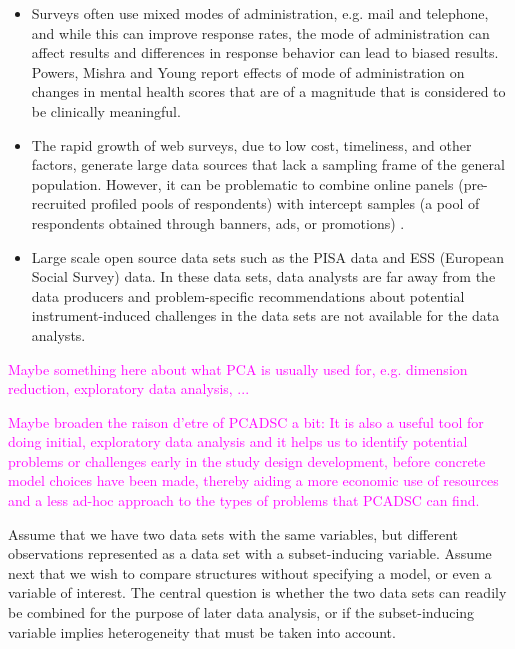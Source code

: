 \documentclass[titlepage,11pt,twoside]{article}
\newcommand{\hl}[1]{\textcolor{magenta}{#1}}
\begin{document}
\begin{itemize}
\item Surveys often use mixed modes of administration, e.g. mail and telephone, and while this can improve response rates, the mode of administration can affect results \cite{Brambilla1987,McHorney1994} and differences in response behavior can lead to biased results. Powers, Mishra and Young \citeyearpar{Powers2005} report effects of mode of administration on changes in mental health scores that are of a magnitude that is considered to be clinically meaningful.
\item The rapid growth of web surveys, due to low cost, timeliness, and other factors, generate large data sources that lack a sampling frame of the general population. However, it can be problematic to combine online panels (pre-recruited profiled pools of respondents) with intercept samples (a pool of respondents obtained through banners, ads, or promotions) \cite{Liu2016}.
\item Large scale open source data sets such as the PISA data and ESS (European Social Survey) data. In these data sets, data analysts are far away from the data producers and problem-specific recommendations about potential instrument-induced challenges in the data sets are not available for the data analysts.
\end{itemize}

\hl{Maybe something here about what PCA is usually used for, e.g. dimension reduction, exploratory data analysis, ...}


\hl{Maybe broaden the raison d'etre of PCADSC a bit: It is also a useful tool for doing initial, exploratory data analysis and it helps us to identify potential problems or challenges early in the study design development, before concrete model choices have been made, thereby aiding a more economic use of resources and a less ad-hoc approach to the types of problems that PCADSC can find.}

Assume that we have two data sets with the same variables, but different observations represented as a data set with
a subset-inducing variable. Assume next that we wish to compare structures without specifying a model, or even a variable of interest. The central question is whether the two data sets can readily be combined for the purpose of later data analysis, or if the subset-inducing variable implies heterogeneity that must be taken into account.
\end{document}
